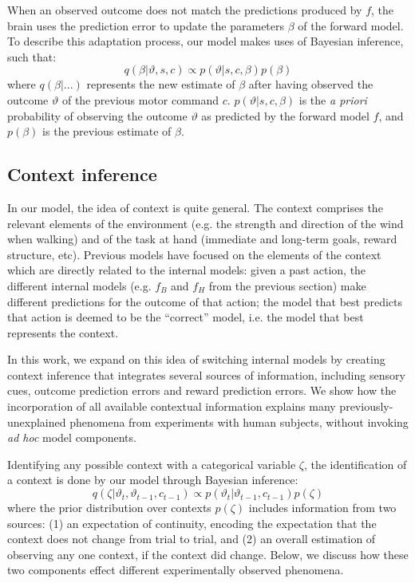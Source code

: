 \documentclass[a4paper,doc,floatsintext,natbib]{apa6}
\begin{document}
When an observed outcome does not match the predictions produced by $f$, the brain uses the prediction error to update the parameters $\beta$ of the forward model. To describe this adaptation process, our model makes uses of Bayesian inference, such that:
\begin{equation}
q(\beta | \vartheta, s, c) \propto p(\vartheta | s, c, \beta)p(\beta)
\end{equation}
where $q(\beta | ...)$ represents the new estimate of $\beta$ after having observed the outcome $\vartheta$ of the previous motor command $c$. $p(\vartheta | s, c, \beta)$ is the \textit{a priori} probability of observing the outcome $\vartheta$ as predicted by the forward model $f$, and $p(\beta)$ is the previous estimate of $\beta$.

\subsection{Context inference}
In our model, the idea of context is quite general. The context comprises the relevant elements of the environment (e.g. the strength and direction of the wind when walking) and of the task at hand (immediate and long-term goals, reward structure, etc). Previous models \cite[e.g.][]{Wolpert_Multiple_1998a,Imamizu_Neural_2008,Oh_Minimizing_2019} have focused on the elements of the context which are directly related to the internal models: given a past action, the different internal models (e.g. $f_B$ and $f_H$ from the previous section) make different predictions for the outcome of that action; the model that best predicts that action is deemed to be the ``correct'' model, i.e. the model that best represents the context.

In this work, we expand on this idea of switching internal models by creating context inference that integrates several sources of information, including sensory cues, outcome prediction errors and reward prediction errors.  We show how the incorporation of all available contextual information explains many previously-unexplained phenomena from experiments with human subjects, without invoking \textit{ad hoc} model components.

Identifying any possible context with a categorical variable $\zeta$, the identification of a context is done by our model through Bayesian inference:
\begin{equation}
q(\zeta | \vartheta_t, \vartheta_{t-1}, c_{t-1}) \propto p(\vartheta_t | \vartheta_{t-1}, c_{t-1})p(\zeta)
\end{equation}
where the prior distribution over contexts $p(\zeta)$ includes information from two sources: (1) an expectation of continuity, encoding the expectation that the context does not change from trial to trial, and (2) an overall estimation of observing any one context, if the context did change. Below, we discuss how these two components effect different experimentally observed phenomena.
\end{document}
